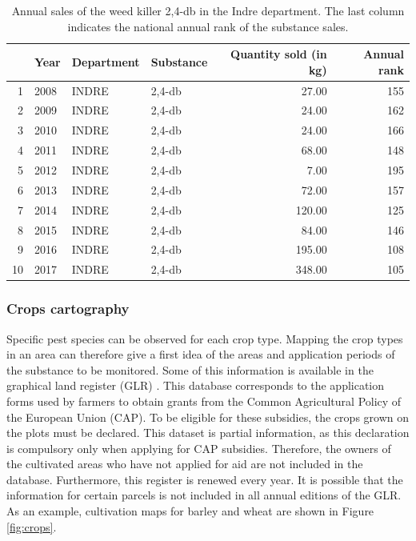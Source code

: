 \begin{table}[ht]
\centering
\begin{tabular}{rlllrr}
  \hline
 & Year & Department & Substance & Quantity sold (in kg) & Annual rank \\ 
  \hline
1 & 2008 & INDRE & 2,4-db & 27.00 & 155 \\ 
  2 & 2009 & INDRE & 2,4-db & 24.00 & 162 \\ 
  3 & 2010 & INDRE & 2,4-db & 24.00 & 166 \\ 
  4 & 2011 & INDRE & 2,4-db & 68.00 & 148 \\ 
  5 & 2012 & INDRE & 2,4-db & 7.00 & 195 \\ 
  6 & 2013 & INDRE & 2,4-db & 72.00 & 157 \\ 
  7 & 2014 & INDRE & 2,4-db & 120.00 & 125 \\ 
  8 & 2015 & INDRE & 2,4-db & 84.00 & 146 \\ 
  9 & 2016 & INDRE & 2,4-db & 195.00 & 108 \\ 
  10 & 2017 & INDRE & 2,4-db & 348.00 & 105 \\ 
   \hline
\end{tabular}
   \caption{Annual sales of the weed killer 2,4-db in the Indre department. The last column indicates the national annual rank of the substance sales.}\label{tab:bnvd}
\end{table}

\subsubsection{Crops cartography}

Specific pest species can be observed for each crop type. Mapping the crop types in an area can therefore give a first idea of the areas and application periods of the substance to be monitored. Some of this information is available in the graphical land register (GLR) \citep{RPG}. This database corresponds to the application forms used by farmers to obtain grants from the Common Agricultural Policy of the European Union (CAP). To be eligible for these subsidies, the crops grown on the plots must be declared. This dataset is partial information, as this declaration is compulsory only when applying for CAP subsidies. Therefore, the owners of the cultivated areas who have not applied for aid are not included in the database. Furthermore, this register is renewed every year. It is possible that the information for certain parcels is not included in all annual editions of the GLR. As an example, cultivation maps for barley and wheat are shown in Figure \ref{fig:crops}.

